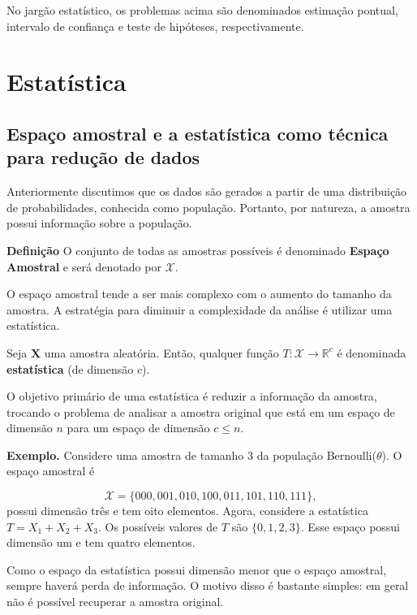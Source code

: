 \documentclass[
  letterpaper,
  DIV=11,
  numbers=noendperiod]{scrreprt}
\begin{document}
No jargão estatístico, os problemas acima são denominados estimação
pontual, intervalo de confiança e teste de hipóteses, respectivamente.


\chapter{Estatística}\label{estatuxedstica}

\section{Espaço amostral e a estatística como técnica para redução de
dados}\label{espauxe7o-amostral-e-a-estatuxedstica-como-tuxe9cnica-para-reduuxe7uxe3o-de-dados}

Anteriormente discutimos que os dados são gerados a partir de uma
distribuição de probabilidades, conhecida como população. Portanto, por
natureza, a amostra possui informação sobre a população.

\textbf{Definição} O conjunto de todas as amostras possíveis é
denominado \textbf{Espaço Amostral} e será denotado por \(\mathcal{X}\).

O espaço amostral tende a ser mais complexo com o aumento do tamanho da
amostra. A estratégia para diminuir a complexidade da análise é utilizar
uma estatística.

Seja \(\textbf{X}\) uma amostra aleatória. Então, qualquer função
\(T:\mathcal{X}\rightarrow \mathbb{R}^c\) é denominada
\textbf{estatística} (de dimensão \(c\)).

O objetivo primário de uma estatística é reduzir a informação da
amostra, trocando o problema de analisar a amostra original que está em
um espaço de dimensão \(n\) para um espaço de dimensão \(c\leq n\).

\textbf{Exemplo.} Considere uma amostra de tamanho 3 da população
Bernoulli(\(\theta\)). O espaço amostral é

\[\mathcal{X}=\{000,001,010,100,011,101,110,111\},\] possui dimensão
três e tem oito elementos. Agora, considere a estatística
\(T=X_1+X_2+X_3\). Os possíveis valores de \(T\) são \(\{0,1,2,3\}\).
Esse espaço possui dimensão um e tem quatro elementos.

Como o espaço da estatística possui dimensão menor que o espaço
amostral, sempre haverá perda de informação. O motivo disso é bastante
simples: em geral não é possível recuperar a amostra original.
\end{document}
